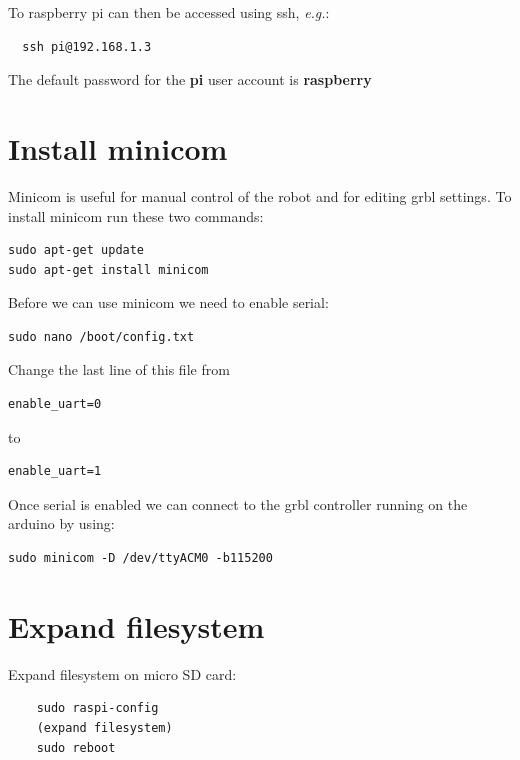 \documentclass[]{book}
\theoremstyle{definition}
\theoremstyle{definition}
\theoremstyle{remark}
\begin{document}
To raspberry pi can then be accessed using ssh, \emph{e.g.}:

\begin{verbatim}
  ssh pi@192.168.1.3
\end{verbatim}

The default password for the \textbf{pi} user account is
\textbf{raspberry}

\section{Install minicom}\label{install-minicom}

Minicom is useful for manual control of the robot and for editing grbl
settings. To install minicom run these two commands:

\begin{verbatim}
sudo apt-get update
sudo apt-get install minicom
\end{verbatim}

Before we can use minicom we need to enable serial:

\begin{verbatim}
sudo nano /boot/config.txt
\end{verbatim}

Change the last line of this file from

\begin{verbatim}
enable_uart=0
\end{verbatim}

to

\begin{verbatim}
enable_uart=1
\end{verbatim}

Once serial is enabled we can connect to the grbl controller running on
the arduino by using:

\begin{verbatim}
sudo minicom -D /dev/ttyACM0 -b115200
\end{verbatim}

\section{Expand filesystem}\label{expand-filesystem}

Expand filesystem on micro SD card:

\begin{verbatim}
    sudo raspi-config
    (expand filesystem)
    sudo reboot
\end{verbatim}
\end{document}
